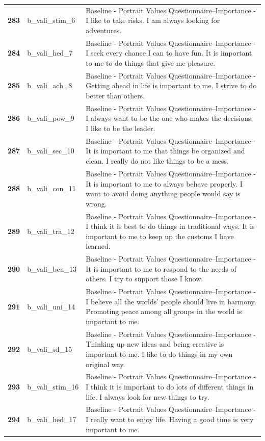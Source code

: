 \documentclass[
  letterpaper,
  DIV=11,
  numbers=noendperiod]{scrartcl}
\begin{document}
\begin{longtable}[t]{>{}cll}
\textbf{283} & b\_vali\_stim\_6 & Baseline - Portrait Values Questionnaire--Importance - I like to take risks. I am always looking for adventures.\\
\textbf{284} & b\_vali\_hed\_7 & Baseline - Portrait Values Questionnaire--Importance - I seek every chance I can to have fun. It is important to me to do things that give me pleasure.\\
\textbf{285} & b\_vali\_ach\_8 & Baseline - Portrait Values Questionnaire--Importance - Getting ahead in life is important to me. I strive to do better than others.\\
\addlinespace
\textbf{286} & b\_vali\_pow\_9 & Baseline - Portrait Values Questionnaire--Importance - I always want to be the one who makes the decisions. I like to be the leader.\\
\textbf{287} & b\_vali\_sec\_10 & Baseline - Portrait Values Questionnaire--Importance - It is important to me that things be organized and clean. I really do not like things to be a mess.\\
\textbf{288} & b\_vali\_con\_11 & Baseline - Portrait Values Questionnaire--Importance - It is important to me to always behave properly. I want to avoid doing anything people would say is wrong.\\
\textbf{289} & b\_vali\_tra\_12 & Baseline - Portrait Values Questionnaire--Importance - I think it is best to do things in traditional ways. It is important to me to keep up the customs I have learned.\\
\textbf{290} & b\_vali\_ben\_13 & Baseline - Portrait Values Questionnaire--Importance - It is important to me to respond to the needs of others. I try to support those I know.\\
\addlinespace
\textbf{291} & b\_vali\_uni\_14 & Baseline - Portrait Values Questionnaire--Importance - I believe all the worlds' people should live in harmony. Promoting peace among all groups in the world is important to me.\\
\textbf{292} & b\_vali\_sd\_15 & Baseline - Portrait Values Questionnaire--Importance - Thinking up new ideas and being creative is important to me. I like to do things in my own original way.\\
\textbf{293} & b\_vali\_stim\_16 & Baseline - Portrait Values Questionnaire--Importance - I think it is important to do lots of different things in life. I always look for new things to try.\\
\textbf{294} & b\_vali\_hed\_17 & Baseline - Portrait Values Questionnaire--Importance - I really want to enjoy life. Having a good time is very important to me.\\

\end{longtable}
\end{document}
